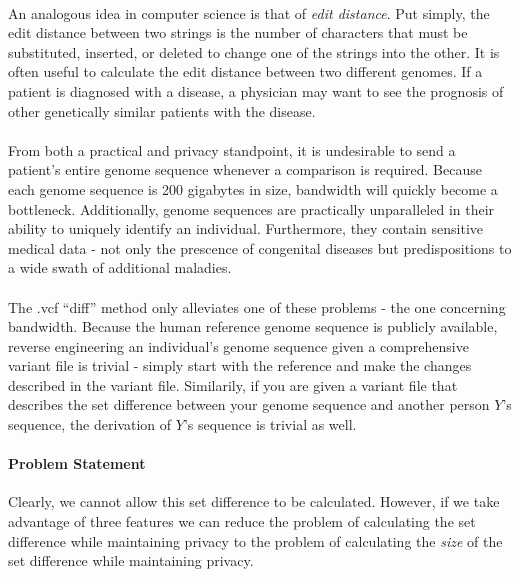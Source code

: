 \paragraph{}
An analogous idea in computer science is that of \textit{edit distance}. Put simply, the edit distance between two strings is the number of characters that must be substituted, inserted, or deleted to change one of the strings into the other. It is often useful to calculate the edit distance between two different genomes. If a patient is diagnosed with a disease, a physician may want to see the prognosis of other genetically similar patients with the disease.

\paragraph{}
From both a practical and privacy standpoint, it is undesirable to send a patient's entire genome sequence whenever a comparison is required. Because each genome sequence is 200 gigabytes in size, bandwidth will quickly become a bottleneck. Additionally, genome sequences are practically unparalleled in their ability to uniquely identify an individual. Furthermore, they contain sensitive medical data - not only the prescence of congenital diseases but predispositions to a wide swath of additional maladies.

\paragraph{}
The .vcf ``diff'' method only alleviates one of these problems - the one concerning bandwidth. Because the human reference genome sequence is publicly available, reverse engineering an individual's genome sequence given a comprehensive variant file is trivial - simply start with the reference and make the changes described in the variant file. Similarily, if you are given a variant file that describes the set difference between your genome sequence and another person $Y$'s sequence, the derivation of $Y$'s sequence is trivial as well. 

\paragraph{Problem Statement}
Clearly, we cannot allow this set difference to be calculated. However, if we take advantage of three features we can reduce the problem of calculating the set difference while maintaining privacy to the problem of calculating the \textit{size} of the set difference while maintaining privacy.

